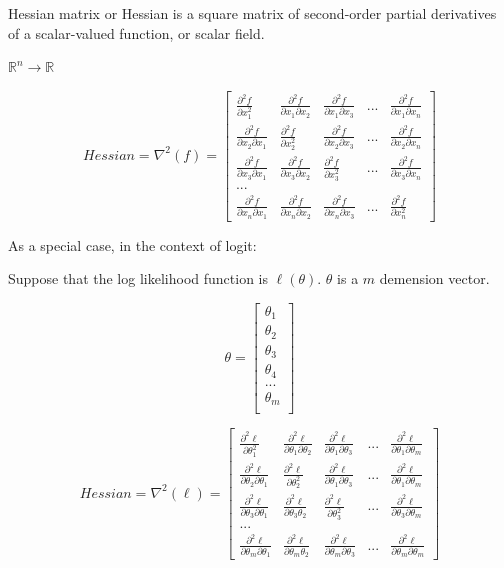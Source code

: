 \documentclass[
]{book}
\begin{document}
Hessian matrix or Hessian is a square matrix of second-order partial derivatives of a scalar-valued function, or scalar field.

\(\mathbb{R}^n \rightarrow \mathbb{R}\)

\[Hessian=\nabla ^2(f) =\begin{bmatrix}
\frac{\partial^2 f}{\partial x_1^2} & \frac{\partial^2 f}{\partial x_1 \partial x_2} & \frac{\partial^2 f}{\partial x_1 \partial x_3} & ... & \frac{\partial^2 f}{\partial x_1 \partial x_n}\\
\frac{\partial^2 f}{\partial x_2 \partial x_1} & \frac{\partial^2 f}{\partial x_2^2} & \frac{\partial^2 f}{\partial x_2 \partial x_3} & ... & \frac{\partial^2 f}{\partial x_2 \partial x_n} \\
\frac{\partial^2 f}{\partial x_3 \partial x_1} & \frac{\partial^2 f}{\partial x_3 \partial x_2} & \frac{\partial^2 f}{\partial x_3^2} & ... & \frac{\partial^2 f}{\partial x_3 \partial x_n} \\
...\\
\frac{\partial^2 f}{\partial x_n \partial x_1} & \frac{\partial^2 f}{\partial x_n \partial x_2} & \frac{\partial^2 f}{\partial x_n \partial x_3} & ... & \frac{\partial^2 f}{\partial x_n^2}
\end{bmatrix}\]

As a special case, in the context of logit:

Suppose that the log likelihood function is \(\ell (\theta)\). \(\theta\) is a \(m\) demension vector.

\[ \theta = \begin{bmatrix}\theta_1 \\
\theta_2 \\
\theta_3 \\
\theta_4 \\
...\\
\theta_m \\
\end{bmatrix}\]

\[Hessian=\nabla ^2(\ell) =\begin{bmatrix}
\frac{\partial^2 \ell}{\partial \theta_1^2} & \frac{\partial^2 \ell}{\partial \theta_1 \partial \theta_2} & \frac{\partial^2 \ell}{\partial \theta_1 \partial \theta_3} & ... & \frac{\partial^2 \ell}{\partial \theta_1 \partial \theta_m}\\
\frac{\partial^2 \ell}{\partial \theta_2 \partial \theta_1} & \frac{\partial^2 \ell}{\partial \theta_2^2 } & \frac{\partial^2 \ell}{\partial \theta_1 \partial \theta_3} & ... & \frac{\partial^2 \ell}{\partial \theta_1 \partial \theta_m} \\
\frac{\partial^2 \ell}{\partial \theta_3 \partial \theta_1} & \frac{\partial^2 \ell}{\partial \theta_3 \theta_2 } & \frac{\partial^2 \ell}{\partial \theta_3^2} & ... & \frac{\partial^2 \ell}{\partial \theta_3 \partial \theta_m} \\
...\\
\frac{\partial^2 \ell}{\partial \theta_m \partial \theta_1} & \frac{\partial^2 \ell}{\partial \theta_m \theta_2 } & \frac{\partial^2 \ell}{\partial \theta_m \partial \theta_3} & ... & \frac{\partial^2 \ell}{\partial \theta_m \partial \theta_m} 
\end{bmatrix}\]
\end{document}
